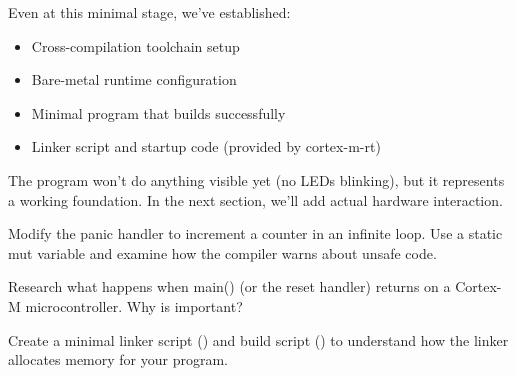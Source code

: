 Even at this minimal stage, we've established:

\begin{itemize}
    \item Cross-compilation toolchain setup
    \item Bare-metal runtime configuration
    \item Minimal program that builds successfully
    \item Linker script and startup code (provided by cortex-m-rt)
\end{itemize}

The program won't do anything visible yet (no LEDs blinking), but it represents a working foundation. In the next section, we'll add actual hardware interaction.

\begin{exercise}[Easy]
    Modify the panic handler to increment a counter in an infinite loop. Use a static mut variable and examine how the compiler warns about unsafe code.
\end{exercise}

\begin{exercise}[Medium]
    Research what happens when main() (or the reset handler) returns on a Cortex-M microcontroller. Why is \codeinline{-> !} important?
\end{exercise}

\begin{exercise}[Hard]
    Create a minimal linker script () and build script () to understand how the linker allocates memory for your program.
\end{exercise}
\clearpage
